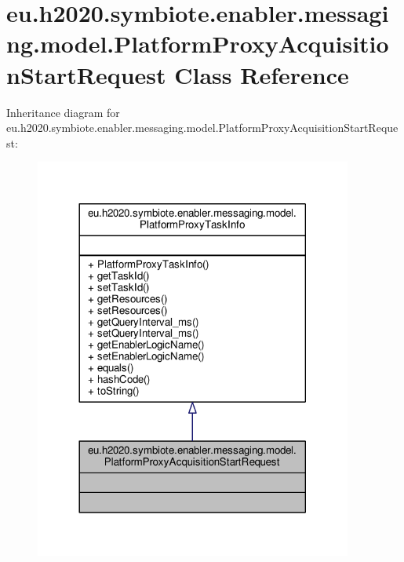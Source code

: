 \hypertarget{classeu_1_1h2020_1_1symbiote_1_1enabler_1_1messaging_1_1model_1_1PlatformProxyAcquisitionStartRequest}{}\section{eu.\+h2020.\+symbiote.\+enabler.\+messaging.\+model.\+Platform\+Proxy\+Acquisition\+Start\+Request Class Reference}
\label{classeu_1_1h2020_1_1symbiote_1_1enabler_1_1messaging_1_1model_1_1PlatformProxyAcquisitionStartRequest}


Inheritance diagram for eu.\+h2020.\+symbiote.\+enabler.\+messaging.\+model.\+Platform\+Proxy\+Acquisition\+Start\+Request\+:
\nopagebreak
\begin{figure}[H]
\begin{center}
\leavevmode
\includegraphics[width=296pt]{classeu_1_1h2020_1_1symbiote_1_1enabler_1_1messaging_1_1model_1_1PlatformProxyAcquisitionStartRequest__inherit__graph}
\end{center}
\end{figure}


